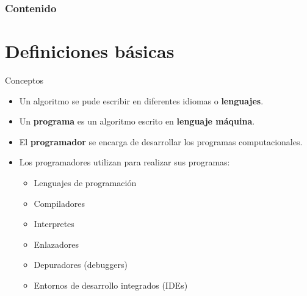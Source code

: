 \begin{frame}
    \frametitle{Contenido}
    \tableofcontents
\end{frame}

\section{Definiciones básicas}

\begin{frame}[c]{Conceptos}
  \begin{itemize}
    \item Un algoritmo se pude escribir en diferentes idiomas o
      \textbf{lenguajes}.
    \pausa
    \item Un \textbf{programa} es un algoritmo escrito en \textbf{lenguaje
      máquina}.
    \pausa
    \item El \textbf{programador} se encarga de desarrollar los programas
      computacionales.
    \pausa
    \item Los programadores utilizan para realizar sus programas:
      \begin{itemize}
        \item Lenguajes de programación
        \pausa
        \item Compiladores
        \pausa
        \item Interpretes
        \pausa
        \item Enlazadores
        \pausa
        \item Depuradores (debuggers)
        \pausa
        \item Entornos de desarrollo integrados (IDEs)
      \end{itemize}
  \end{itemize}
\end{frame}

